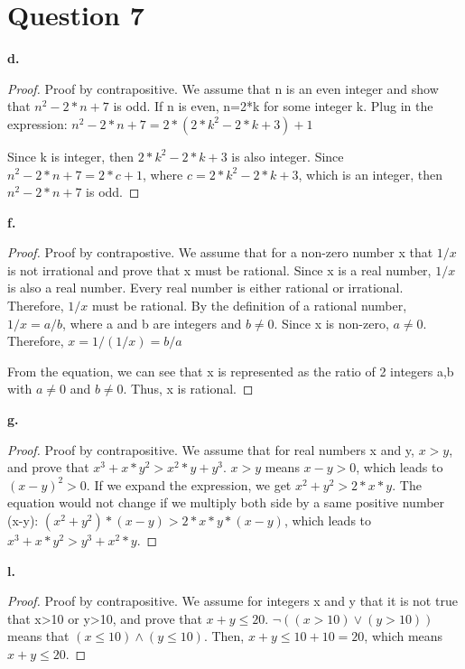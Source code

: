 \documentclass[11pt]{article}
\begin{document}
	\newpage
	\section*{Question 7}
	\textbf{d.}
	\begin{proof}
	
	Proof by contrapositive. We assume that n is an even integer and show that $n^2-2*n+7$ is odd. If n is even, n=2*k for some integer k. Plug in the expression: $n^2-2*n+7=2*(2*k^2-2*k+3)+1$
	
	Since k is integer, then $2*k^2-2*k+3$ is also integer. Since $n^2-2*n+7=2*c+1$, where $c=2*k^2-2*k+3$, which is an integer, then $n^2-2*n+7$ is odd. 
	\end{proof}
	
	\vspace{2mm}
	\textbf{f.}
	\begin{proof}
	
	Proof by contrapostive. We assume that  for a non-zero number x that $1/x$ is not irrational and prove that x must be rational. Since x is a real number, $1/x$ is also a real number. Every real number is either rational or irrational. Therefore, $1/x$ must be rational. By the definition of a rational number, $1/x=a/b$, where a and b are integers and $b\neq 0$. Since x is non-zero, $a\neq 0$. Therefore, $x=1/(1/x)=b/a$
	
	From the equation, we can see that x is represented as the ratio of 2 integers a,b with $a\neq 0$ and $b\neq 0$. Thus, x is rational.
	\end{proof}
	
	\vspace{2mm}
	\textbf{g.}
	\begin{proof}
	
	Proof by contrapositive. We assume that for real numbers x and y, $x>y$, and prove that $x^3+x*y^2>x^2*y+y^3$. $x>y$ means $x-y>0$, which leads to $(x-y)^2>0$. If we expand the expression, we get $x^2+y^2>2*x*y$. The equation would not change if we multiply both side by a same positive number (x-y): $(x^2+y^2)*(x-y)>2*x*y*(x-y)$, which leads to $x^3+x*y^2>y^3+x^2*y$. 
	\end{proof}
	
	\vspace{2mm}
	\textbf{l.}
	\begin{proof}
	
	Proof by contrapositive. We assume for integers x and y that it is not true that x>10 or y>10, and prove that $x+y\leq 20$. $\neg ((x>10)\vee (y>10))$ means that $(x\leq 10)\wedge (y\leq 10)$. Then, $x+y\leq 10+10=20$, which means $x+y\leq 20$. 
	\end{proof}
	
\end{document}
